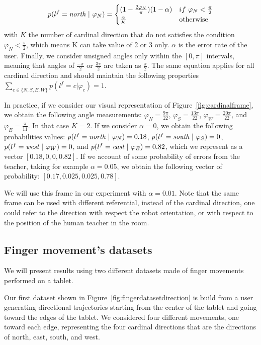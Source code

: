 \begin{equation}
    p(l^f = \emph{north}~|~\varphi_N) = 
    \begin{cases}
    (1 - \frac{2 \varphi_N}{\pi}) (1-\alpha) & if~\varphi_N < \frac{\pi}{2}\\
        \frac{\alpha}{K}  & \text{otherwise}\\
   \end{cases}
   \label{eq:cardinalframe}
\end{equation}
with $K$ the number of cardinal direction that do not satisfies the condition $\varphi_N < \frac{\pi}{2}$, which means K can take value of 2 or 3 only. $\alpha$ is the error rate of the user. Finally, we consider unsigned angles only within the $[0, \pi]$ intervals, meaning that angles of $\frac{-\pi}{2}$ or $\frac{3\pi}{2}$ are taken as $\frac{\pi}{2}$. The same equation applies for all cardinal direction and should maintain the following properties $\sum_{c \in \{N,S,E,W\}} p(l^f = c |\varphi_c) = 1$.

In practice, if we consider our visual representation of Figure~\ref{fig:cardinalframe}, we obtain the following angle measurements: $\varphi_N = \frac{9\pi}{22}$, $\varphi_S = \frac{13\pi}{22}$, $\varphi_W = \frac{20\pi}{22}$, and $\varphi_E = \frac{\pi}{11}$. In that case $K = 2$. If we consider $\alpha = 0$, we obtain the following probabilities values: $p(l^f = \emph{north}~|~\varphi_N) = 0.18$, $p(l^f = \emph{south}~|~\varphi_S) = 0$, $p(l^f = \emph{west}~|~\varphi_W) = 0$, and $p(l^f = \emph{east}~|~\varphi_E) = 0.82$, which we represent as a vector $[0.18,0,0,0.82]$. If we account of some probability of errors from the teacher, taking for example $\alpha = 0.05$, we obtain the following vector of probability: $[0.17, 0.025, 0.025,0.78]$.

We will use this frame in our experiment with $\alpha = 0.01$. Note that the same frame can be used with different referential, instead of the cardinal direction, one could refer to the direction with respect the robot orientation, or with respect to the position of the human teacher in the room.

\subsection{Finger movement’s datasets}

We will present results using two different datasets made of finger movements performed on a tablet. 

Our first dataset shown in Figure~\ref{fig:fingerdatasetdirection} is build from a user generating directional trajectories starting from the center of the tablet and going toward the edges of the tablet. We considered four different movements, one toward each edge, representing the four cardinal directions that are the directions of north, east, south, and west.

